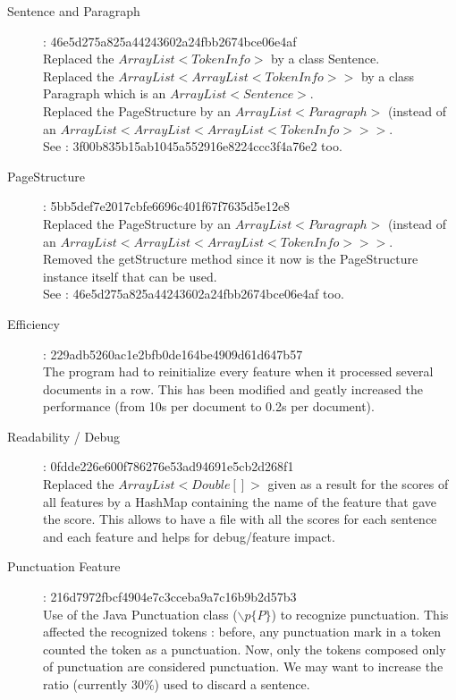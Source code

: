 \documentclass[a4paper,10pt]{article}
\begin{document}
\begin{description}
\item[Sentence and Paragraph] : \hfill
  46e5d275a825a44243602a24fbb2674bce06e4af \\
  Replaced the $ArrayList<TokenInfo>$ by a class Sentence.\\
  Replaced the $ArrayList<ArrayList<TokenInfo>>$ by a class Paragraph
  which is an $ArrayList<Sentence>$.\\
  Replaced the PageStructure by an $ArrayList<Paragraph>$ (instead of
  an $ArrayList<ArrayList<ArrayList<TokenInfo>>>$.\\
  See : 3f00b835b15ab1045a552916e8224ccc3f4a76e2 too.

\item[PageStructure] : \hfill 5bb5def7e2017cbfe6696c401f67f7635d5e12e8
  \\
  Replaced the PageStructure by an $ArrayList<Paragraph>$ (instead of
  an $ArrayList<ArrayList<ArrayList<TokenInfo>>>$.\\
  Removed the getStructure method since it now is the PageStructure
  instance itself that can be used.\\
  See : 46e5d275a825a44243602a24fbb2674bce06e4af too.

\item [Efficiency] : \hfill 229adb5260ac1e2bfb0de164be4909d61d647b57
  \\
  The program had to reinitialize every feature when it processed
  several documents in a row. This has been modified and geatly
  increased the performance (from 10s per document to 0.2s per
  document).

\item[Readability / Debug] : \hfill
  0fdde226e600f786276e53ad94691e5cb2d268f1 \\
  Replaced the $ArrayList<Double[]>$ given as a result for the scores
  of all features by a HashMap containing the name of the feature that
  gave the score. This allows to have a file with all the scores for
  each sentence and each feature and helps for debug/feature impact.

\item[Punctuation Feature] : \hfill
  216d7972fbcf4904e7c3cceba9a7c16b9b2d57b3 \\
  Use of the Java Punctuation class ($\backslash p\{P\}$) to recognize
  punctuation. This affected the recognized tokens : before, any
  punctuation mark in a token counted the token as a punctuation. Now,
  only the tokens composed only of punctuation are considered
  punctuation. We may want to increase the ratio (currently 30\%) used
  to discard a sentence.


\end{description}
\end{document}
